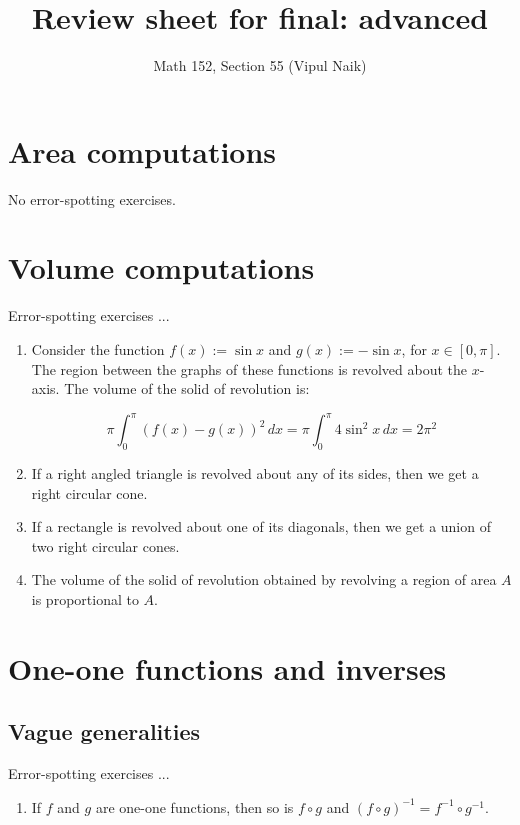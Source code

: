 \documentclass[10pt]{amsart}
\title{Review sheet for final: advanced}
\author{Math 152, Section 55 (Vipul Naik)}
\begin{document}
\maketitle

\section{Area computations}

No error-spotting exercises.

\section{Volume computations}

Error-spotting exercises ...

\begin{enumerate}
\item Consider the function $f(x) := \sin x$ and $g(x) := -\sin x$,
  for $x \in [0,\pi]$. The region between the graphs of these
  functions is revolved about the $x$-axis. The volume of the solid of
  revolution is:

  $$\pi \int_0^\pi (f(x) - g(x))^2 \, dx = \pi \int_0^\pi 4 \sin^2 x \, dx = 2\pi^2$$

\item If a right angled triangle is revolved about any of its sides,
  then we get a right circular cone.

\item If a rectangle is revolved about one of its diagonals, then we
  get a union of two right circular cones.

\item The volume of the solid of revolution obtained by revolving a
  region of area $A$ is proportional to $A$.
\end{enumerate}

\section{One-one functions and inverses}

\subsection{Vague generalities}

Error-spotting exercises ...

\begin{enumerate}
\item If $f$ and $g$ are one-one functions, then so is $f \circ g$ and
  $(f \circ g)^{-1} = f^{-1} \circ g^{-1}$.
\end{enumerate}
\end{document}
